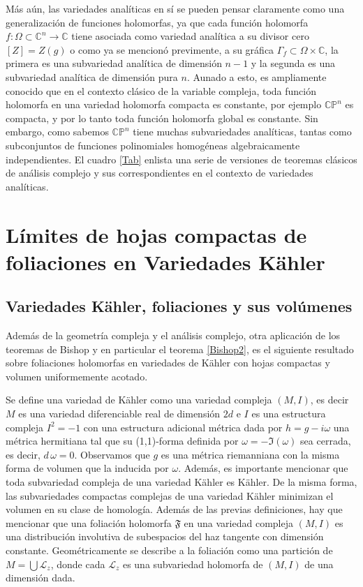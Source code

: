 \documentclass{article}
\newcommand{\co}{\ensuremath{\mathbb C }}
\newcommand{\con}{\ensuremath{\mathbb{C}^n}}
\newcommand{\cp}{\ensuremath{\mathbb{CP}}}
\begin{document}
M\'as a\'un, las variedades anal\'iticas en s\'i se pueden pensar claramente como una generalizaci\'on de funciones holomorfas, 
ya que cada funci\'on holomorfa $f:\Omega\subset\con\rightarrow\co$ tiene asociada como variedad anal\'itica a su divisor cero $[Z]=Z(g)$
o como ya se mencion\'o previmente, a su gr\'afica $\Gamma_{f}\subset\Omega\times\co$, la primera es una subvariedad anal\'itica de dimensi\'on $n-1$ y la segunda es
una subvariedad anal\'itica de dimensi\'on pura $n$. Aunado a esto, es ampliamente conocido que en el contexto cl\'asico
de la variable compleja, toda funci\'on holomorfa en una variedad holomorfa compacta es constante, por ejemplo $\cp^n$ es compacta,
y por lo tanto toda funci\'on holomorfa global es constante. Sin embargo, como sabemos $\cp^n$ tiene muchas subvariedades anal\'iticas, tantas
como subconjuntos de funciones polinomiales homog\'eneas algebraicamente independientes. El cuadro \ref{Tab} enlista una serie de
versiones de teoremas cl\'asicos de an\'alisis complejo y sus correspondientes en el contexto de variedades anal\'iticas.

\section{L\'imites de hojas compactas de foliaciones en Variedades K\"ahler}
\subsection{Variedades K\"ahler, foliaciones y sus vol\'umenes}
\noindent Adem\'as de la geometr\'ia compleja y el an\'alisis complejo, otra aplicaci\'on de los teoremas de Bishop y en particular el teorema
\ref{Bishop2}, es el siguiente resultado sobre foliaciones holomorfas en variedades de K\"ahler con hojas compactas y volumen 
uniformemente acotado. 

Se define una variedad de K\"ahler como una variedad compleja $(M,I)$, es decir $M$ es una variedad diferenciable real de dimensi\'on $2d$ e 
$I$ es una estructura compleja $I^2=-1$ con una estructura adicional m\'etrica dada por $h=g-i\omega$ una m\'etrica hermitiana tal que su 
(1,1)-forma definida por $\omega=-\Im (\omega)$ sea cerrada, es decir, $d\,\omega=0$. Observamos que $g$ es una m\'etrica riemanniana con la misma 
forma de volumen que la inducida por $\omega$. Adem\'as, es importante mencionar que toda subvariedad compleja de una variedad K\"ahler es 
K\"ahler. De la misma forma, las subvariedades compactas complejas de una variedad K\"ahler minimizan el volumen en su clase de homolog\'ia. 
Adem\'as de las previas definiciones, hay que mencionar que una foliaci\'on holomorfa $\mathfrak{F}$ en una variedad compleja $(M,I)$ es una 
distribuci\'on involutiva de subespacios del haz tangente con dimensi\'on constante. Geom\'etricamente se describe a la foliaci\'on como 
una partici\'on de $M=\bigcup\mathcal{L}_z$, donde cada $\mathcal{L}_z$ es una subvariedad holomorfa de $(M,I)$ de una dimensi\'on dada.
\end{document}
